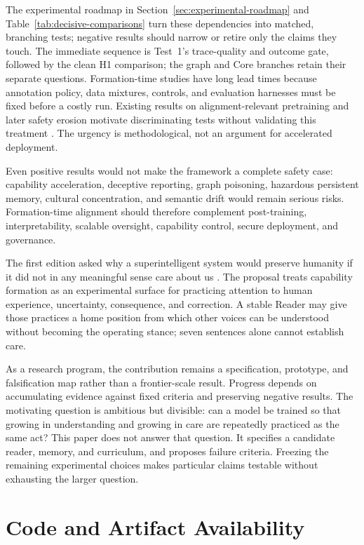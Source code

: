 The experimental roadmap in Section~\ref{sec:experimental-roadmap} and
Table~\ref{tab:decisive-comparisons} turn these dependencies into matched,
branching tests; negative results should narrow or retire only the claims they
touch. The immediate sequence is Test~1's trace-quality and outcome gate,
followed by the clean H1 comparison; the graph and Core branches retain their
separate questions. Formation-time studies have long lead times because annotation policy,
data mixtures, controls, and evaluation harnesses must be fixed before a costly
run. Existing results on alignment-relevant pretraining and later safety erosion
motivate discriminating tests without validating this treatment
\cite{betley2025alignment,qi2024safety}. The urgency is methodological, not an
argument for accelerated deployment.

Even positive results would not make the framework a complete safety case:
capability acceleration, deceptive reporting, graph poisoning, hazardous
persistent memory, cultural concentration, and semantic drift would remain
serious risks.
Formation-time alignment should therefore complement post-training,
interpretability, scalable oversight, capability control, secure deployment,
and governance.

The first edition asked why a superintelligent system would preserve humanity
if it did not in any meaningful sense care about us
\cite{westerberg2025superintelligence}. The proposal treats capability
formation as an experimental surface for practicing attention to human
experience, uncertainty, consequence, and correction. A stable Reader may give
those practices a home position from which other voices can be understood
without becoming the operating stance; seven sentences alone cannot establish
care.

As a research program, the contribution remains a specification, prototype, and
falsification map rather than a frontier-scale result. Progress depends on accumulating
evidence against fixed criteria and preserving negative results. The motivating
question is ambitious but divisible:
can a model be trained so that
growing in understanding and growing in care are repeatedly practiced as the
same act? This paper does not answer that question. It specifies a candidate
reader, memory, and curriculum, and proposes failure criteria. Freezing the
remaining experimental choices makes particular claims testable without
exhausting the larger question.

	\section*{Code and Artifact Availability}

